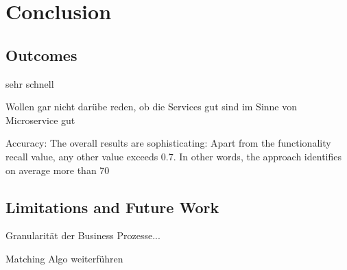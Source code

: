 \chapter{Conclusion}
\label{ch:Conclusion}


\section{Outcomes}

sehr schnell


Wollen gar nicht darübe reden, ob die Services gut sind im Sinne von Microservice gut


Accuracy:
The overall results are sophisticating: Apart from the functionality recall value, any other value exceeds 0.7. In other words, the approach identifies on average more than 70   

\section{Limitations and Future Work}
Granularität der Business Prozesse...


Matching Algo weiterführen